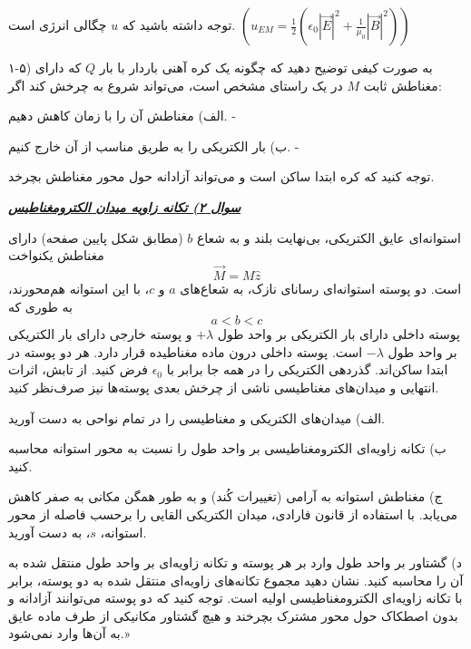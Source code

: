 \documentclass[11pt,a4paper]{article}
\begin{document}
توجه داشته باشید که $u$ چگالی انرژی است. $\left( u_{EM} = \frac{1}{2} \left( \epsilon_0 |\vec{E}|^2 + \frac{1}{\mu_0} |\vec{B}|^2 \right) \right)$

۱-۵) به صورت کیفی توضیح دهید که چگونه یک کره آهنی باردار با بار $Q$ که دارای مغناطش ثابت $M$ در یک راستای مشخص است، می‌تواند شروع به چرخش کند اگر:

الف) مغناطش آن را با زمان کاهش دهیم. - 

ب) بار الکتریکی را به طریق مناسب از آن خارج کنیم. - 

\vspace{4pt}
توجه کنید که کره ابتدا ساکن است و می‌تواند آزادانه حول محور مغناطش بچرخد.

\newpage

\underline{\textbf{\textit{سوال ۲) تکانه زاویه میدان الکترومغناطیس}}}

\vspace{8pt}
استوانه‌ای عایق الکتریکی، بی‌نهایت بلند و به شعاع $b$ (مطابق شکل پایین صفحه) دارای مغناطش یکنواخت
\[
\vec{M} = M\hat{z}
\]
است. دو پوسته استوانه‌ای رسانای نازک، به شعاع‌های $a$ و $c$، با این استوانه هم‌محورند، به طوری که
\[
a < b < c
\]
پوسته داخلی دارای بار الکتریکی بر واحد طول $+\lambda$ و پوسته خارجی دارای بار الکتریکی بر واحد طول $-\lambda$ است. پوسته داخلی درون ماده مغناطیده قرار دارد. هر دو پوسته در ابتدا ساکن‌اند. گذردهی الکتریکی را در همه جا برابر با $\epsilon_0$ فرض کنید. از تابش، اثرات انتهایی و میدان‌های مغناطیسی ناشی از چرخش بعدی پوسته‌ها نیز صرف‌نظر کنید.

\vspace{6pt}
الف) میدان‌های الکتریکی و مغناطیسی را در تمام نواحی به دست آورید.

ب) تکانه زاویه‌ای الکترومغناطیسی بر واحد طول را نسبت به محور استوانه محاسبه کنید.

ج) مغناطش استوانه به آرامی (تغییرات کُند) و به طور همگن مکانی به صفر کاهش می‌یابد. با استفاده از قانون فارادی، میدان الکتریکی القایی را برحسب فاصله از محور استوانه، $s$، به دست آورید.

د) گشتاور بر واحد طول وارد بر هر پوسته و تکانه زاویه‌ای بر واحد طول منتقل شده به آن را محاسبه کنید. نشان دهید مجموع تکانه‌های زاویه‌ای منتقل شده به دو پوسته، برابر با تکانه زاویه‌ای الکترومغناطیسی اولیه است. توجه کنید که دو پوسته می‌توانند آزادانه و بدون اصطکاک حول محور مشترک بچرخند و هیچ گشتاور مکانیکی از طرف ماده عایق به آن‌ها وارد نمی‌شود.»
\end{document}
